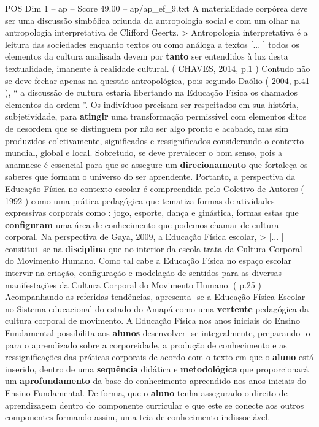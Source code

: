 \begin{textsample}{POS Dim 1 – ap – Score 49.00 – ap/ap\_ef\_9.txt}
A materialidade corpórea deve ser uma discussão simbólica oriunda da antropologia social e com um olhar na antropologia interpretativa de Clifford Geertz. > Antropologia interpretativa é a leitura das sociedades enquanto textos ou como análoga a textos [... ] todos os elementos da cultura analisada devem por \textbf{tanto} ser entendidos à luz desta textualidade, imanente à realidade cultural. ( CHAVES, 2014, p.1 ) Contudo não se deve fechar apenas na questão antropológica, pois segundo Daólio ( 2004, p.41 ), “ a discussão de cultura estaria libertando na Educação Física os chamados elementos da ordem ”.
Os indivíduos precisam ser respeitados em sua história, subjetividade, para \textbf{atingir} uma transformação permissível com elementos ditos de desordem que se distinguem por não ser algo pronto e acabado, mas sim produzidos coletivamente, significados e ressignificados considerando o contexto mundial, global e local.
Sobretudo, se deve prevalecer o bom senso, pois a anamnese é essencial para que se assegure um \textbf{direcionamento} que fortaleça os saberes que formam o universo do ser aprendente.
Portanto, a perspectiva da Educação Física no contexto escolar é compreendida pelo Coletivo de Autores ( 1992 ) como uma prática pedagógica que tematiza formas de atividades expressivas corporais como : jogo, esporte, dança e ginástica, formas estas que \textbf{configuram} uma área de conhecimento que podemos chamar de cultura corporal.
Na perspectiva de Gaya, 2009, a Educação Física escolar, > [... ] constitui -se na \textbf{disciplina} que no interior da escola trata da Cultura Corporal do Movimento Humano.
Como tal cabe a Educação Física no espaço escolar intervir na criação, configuração e modelação de sentidos para as diversas manifestações da Cultura Corporal do Movimento Humano. ( p.25 ) Acompanhando as referidas tendências, apresenta -se a Educação Física Escolar no Sistema educacional do estado do Amapá como uma \textbf{vertente} pedagógica da cultura corporal de movimento.
A Educação Física nos anos iniciais do Ensino Fundamental possibilita aos \textbf{alunos} desenvolver -se integralmente, preparando -o para o aprendizado sobre a corporeidade, a produção de conhecimento e as ressignificações das práticas corporais de acordo com o texto em que o \textbf{aluno} está inserido, dentro de uma \textbf{sequência} didática e \textbf{metodológica} que proporcionará um \textbf{aprofundamento} da base do conhecimento apreendido nos anos iniciais do Ensino Fundamental.
De forma, que o \textbf{aluno} tenha assegurado o direito de aprendizagem dentro do componente curricular e que este se conecte aos outros componentes formando assim, uma teia de conhecimento indissociável.

\end{textsample}
